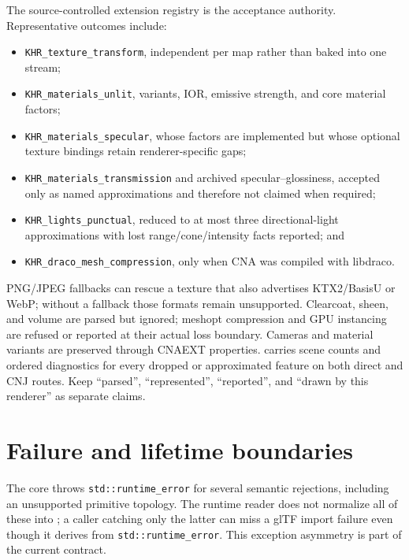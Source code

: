 The source-controlled extension registry is the acceptance authority. Representative outcomes
include:

\begin{itemize}
  \item \texttt{KHR\_texture\_transform}, independent per map rather than baked into one stream;
  \item \texttt{KHR\_materials\_unlit}, variants, IOR, emissive strength, and core material
        factors;
  \item \texttt{KHR\_materials\_specular}, whose factors are implemented but whose optional
        texture bindings retain renderer-specific gaps;
  \item \texttt{KHR\_materials\_transmission} and archived specular--glossiness, accepted only as
        named approximations and therefore not claimed when required;
  \item \texttt{KHR\_lights\_punctual}, reduced to at most three directional-light
        approximations with lost range/cone/intensity facts reported; and
  \item \texttt{KHR\_draco\_mesh\_compression}, only when CNA was compiled with libdraco.
\end{itemize}

PNG/JPEG fallbacks can rescue a texture that also advertises KTX2/BasisU or WebP; without a
fallback those formats remain unsupported. Clearcoat, sheen, and volume are parsed but ignored;
meshopt compression and GPU instancing are refused or reported at their actual loss boundary.
Cameras and material variants are preserved through CNAEXT  properties.
 carries scene counts and ordered diagnostics for every dropped or
approximated feature on both direct and CNJ routes. Keep ``parsed'', ``represented'',
``reported'', and ``drawn by this renderer'' as separate claims.

\section{Failure and lifetime boundaries}

The core throws \texttt{std::runtime\_error} for several semantic rejections, including an
unsupported primitive topology. The runtime reader does not normalize all of these into
; a caller catching only the latter can miss a glTF import
failure even though it derives from \texttt{std::runtime\_error}. This exception asymmetry is
part of the current contract.

